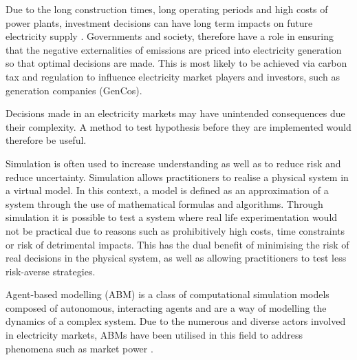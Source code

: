 
 Due to the long construction times, long operating periods and high costs of power plants, investment decisions can have long term impacts on future electricity supply \cite{Chappin2017}. Governments and society, therefore have a role in ensuring that the negative externalities of emissions are priced into electricity generation so that optimal decisions are made. This is most likely to be achieved via carbon tax and regulation to influence electricity market players and investors, such as generation companies (GenCos).


Decisions made in an electricity markets may have unintended consequences due their complexity. A method to test hypothesis before they are implemented would therefore be useful.

Simulation is often used to increase understanding as well as to reduce risk and reduce uncertainty. Simulation allows practitioners to realise a physical system in a virtual model. In this context, a model is defined as an approximation of a system through the use of mathematical formulas and algorithms. Through simulation it is possible to test a system where real life experimentation would not be practical due to reasons such as prohibitively high costs, time constraints or risk of detrimental impacts. This has the dual benefit of minimising the risk of real decisions in the physical system, as well as allowing practitioners to test less risk-averse strategies.

Agent-based modelling (ABM) is a class of computational simulation models composed of autonomous, interacting agents and are a way of modelling the dynamics of a complex system. Due to the numerous and diverse actors involved in electricity markets, ABMs have been utilised in this field to address phenomena such as market power \cite{Ringler2016a}.

